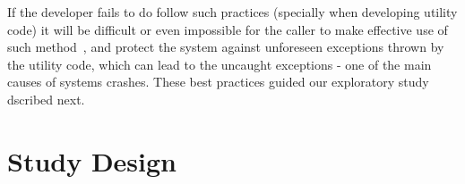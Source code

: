 \documentclass[conference]{IEEEtran}
\begin{document}
If the developer fails to do follow such practices (specially when developing 
utility code) it will be difficult or even impossible for the caller to 
make effective use of such method~\cite{wirfs2006toward, bloch2008effective},
and protect the system against unforeseen exceptions thrown by the utility code,
which can lead to the uncaught exceptions - one of the main causes of 
systems crashes. These best practices guided our exploratory study dscribed next.






\section{Study Design}
\label{sec:study}
\end{document}
